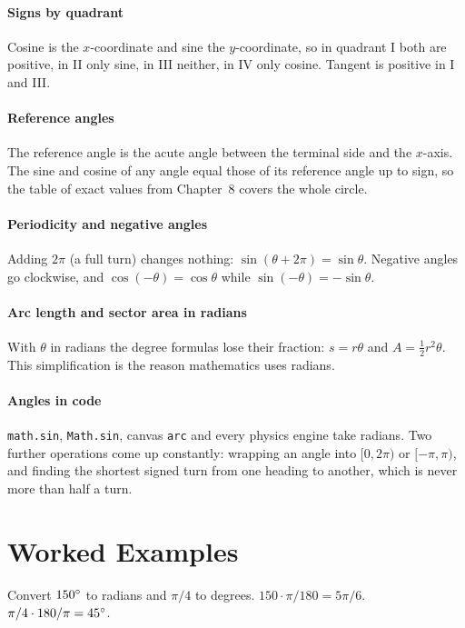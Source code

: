 \paragraph{Signs by quadrant} Cosine is the $x$-coordinate and sine the $y$-coordinate, so in quadrant I both are positive, in II only sine, in III neither, in IV only cosine. Tangent is positive in I and III.

\paragraph{Reference angles} The reference angle is the acute angle between the terminal side and the $x$-axis. The sine and cosine of any angle equal those of its reference angle up to sign, so the table of exact values from Chapter~8 covers the whole circle.

\paragraph{Periodicity and negative angles} Adding $2\pi$ (a full turn) changes nothing: $\sin(\theta + 2\pi) = \sin\theta$. Negative angles go clockwise, and $\cos(-\theta) = \cos\theta$ while $\sin(-\theta) = -\sin\theta$.

\paragraph{Arc length and sector area in radians} With $\theta$ in radians the degree formulas lose their fraction: $s = r\theta$ and $A = \tfrac{1}{2}r^2\theta$. This simplification is the reason mathematics uses radians.

\paragraph{Angles in code} \lstinline!math.sin!, \lstinline!Math.sin!, canvas \lstinline!arc! and every physics engine take radians. Two further operations come up constantly: wrapping an angle into $[0, 2\pi)$ or $[-\pi, \pi)$, and finding the shortest signed turn from one heading to another, which is never more than half a turn.

\section{Worked Examples}

\begin{example}
Convert $150^\circ$ to radians and $\pi/4$ to degrees.
\solution $150 \cdot \pi/180 = 5\pi/6$. $\pi/4 \cdot 180/\pi = 45^\circ$.
\end{example}

